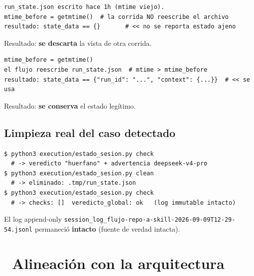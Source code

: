 \documentclass[11pt,a4paper]{article}
\newcommand{\iconotexto}[2]{\textcolor{cyanNeon}{\faIcon{#1}}~#2}
\begin{document}
\begin{tcolorbox}[cajaFortaleza, title=Caso A --- vista huérfana (no reescrita)]
\begin{lstlisting}[style=estiloPython]
run_state.json escrito hace 1h (mtime viejo).
mtime_before = getmtime()  # la corrida NO reescribe el archivo
resultado: state_data == {}       # << no se reporta estado ajeno
\end{lstlisting}
Resultado: \textbf{se descarta} la vista de otra corrida. 
\end{tcolorbox}

\begin{tcolorbox}[cajaFortaleza, title=Caso B --- estado reescrito por la corrida]
\begin{lstlisting}[style=estiloPython]
mtime_before = getmtime()
el flujo reescribe run_state.json  # mtime > mtime_before
resultado: state_data == {"run_id": "...", "context": {...}}  # << se usa
\end{lstlisting}
Resultado: \textbf{se conserva} el estado legítimo. 
\end{tcolorbox}

\subsection{Limpieza real del caso detectado}
\begin{lstlisting}[style=estiloPython]
$ python3 execution/estado_sesion.py check
  # -> veredicto "huerfano" + advertencia deepseek-v4-pro
$ python3 execution/estado_sesion.py clean
  # -> eliminado: .tmp/run_state.json
$ python3 execution/estado_sesion.py check
  # -> checks: []  veredicto_global: ok   (log immutable intacto)
\end{lstlisting}

El log append-only \texttt{session\_log\_flujo-repo-a-skill-2026-09-09T12-29-54.jsonl}
permaneció \textbf{intacto} (fuente de verdad intacta).

\section{\iconotexto{sitemap}{Alineación con la arquitectura}}
\end{document}
